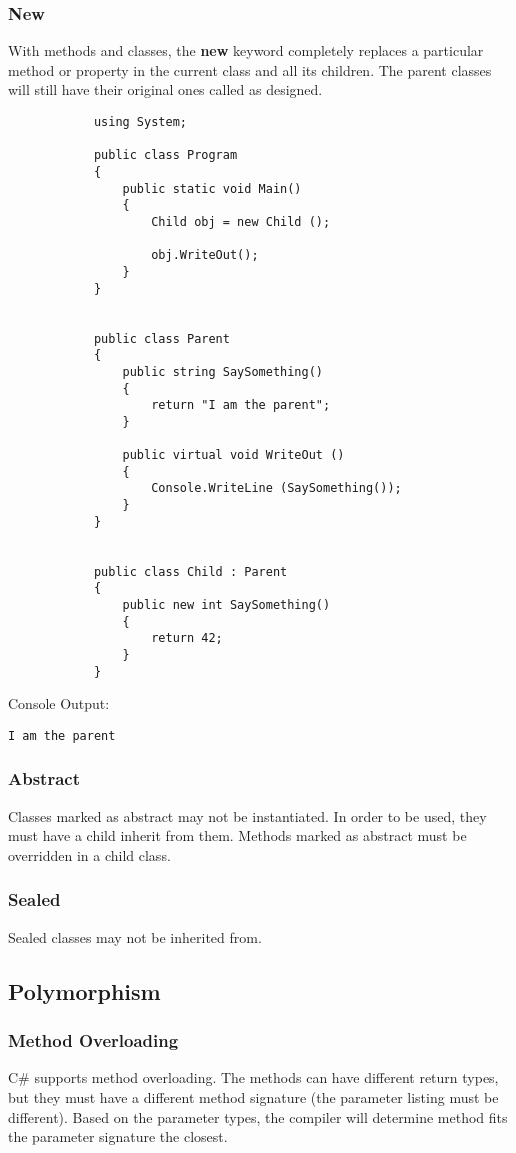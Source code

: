 \documentclass {amsart}
\begin{document}
		\subsubsection{New}  With methods and classes, the {\bf new} keyword completely replaces a particular method or property in the current class and all its children.  The parent classes will still have their original ones called as designed. 

			\begin{lstlisting}
			using System;
								
			public class Program
			{
				public static void Main()
				{
					Child obj = new Child ();
					
					obj.WriteOut();
				}
			}


			public class Parent 
			{
				public string SaySomething()
				{
					return "I am the parent";		
				}
				
				public virtual void WriteOut () 
				{
					Console.WriteLine (SaySomething());	
				}
			}


			public class Child : Parent
			{
				public new int SaySomething()
				{
					return 42;		
				}
			}
			\end{lstlisting}
		Console Output: 
		\begin{verbatim}I am the parent\end{verbatim}

		\subsubsection{Abstract}  Classes marked as abstract may not be instantiated.  In order to be used, they must have a child inherit from them.  Methods marked as abstract must be overridden in a child class. 
		\subsubsection{Sealed} Sealed classes may not be inherited from.  

	\subsection{Polymorphism}
		\subsubsection{Method Overloading}  C\# supports method overloading.  The methods can have different return types, but they must have a different method signature (the parameter listing must be different).  Based on the parameter types, the compiler will determine method fits the parameter signature the closest. 
	
\end{document}
